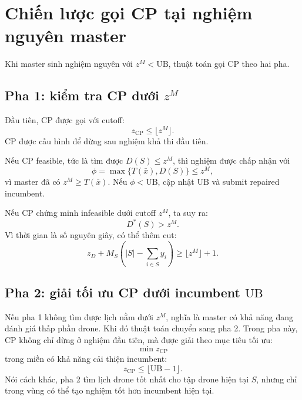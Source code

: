 \documentclass[12pt,a4paper]{article}
\newcommand{\UB}{\mathrm{UB}}
\begin{document}
\section{Chiến lược gọi CP tại nghiệm nguyên master}
\label{sec:cp-validation}

Khi master sinh nghiệm nguyên với $z^M<\UB$, thuật toán gọi CP theo hai pha.

\subsection{Pha 1: kiểm tra CP dưới $z^M$}

Đầu tiên, CP được gọi với cutoff:
\begin{equation}
    z_{\mathrm{CP}}\le \lfloor z^M\rfloor.
    \label{eq:cp-cutoff-zm}
\end{equation}
CP được cấu hình để dừng sau nghiệm khả thi đầu tiên.

Nếu CP feasible, tức là tìm được $D(S)\le z^M$, thì nghiệm được chấp nhận với
\[
    \phi=\max\{T(\bar x),D(S)\}\le z^M,
\]
vì master đã có $z^M\ge T(\bar x)$. Nếu $\phi<\UB$, cập nhật $\UB$ và submit repaired incumbent.

Nếu CP chứng minh infeasible dưới cutoff $z^M$, ta suy ra:
\[
    D^*(S)>z^M.
\]
Vì thời gian là số nguyên giây, có thể thêm cut:
\begin{equation}
    z_D+M_S\left(|S|-\sum_{i\in S}y_i\right)
    \ge \lfloor z^M\rfloor+1.
    \label{eq:cut-zm-plus-one}
\end{equation}

\subsection{Pha 2: giải tối ưu CP dưới incumbent $\UB$}
\label{subsec:phase2-optimal-cp}

Nếu pha 1 không tìm được lịch nằm dưới $z^M$, nghĩa là master có khả năng đang đánh giá thấp phần drone. Khi đó thuật toán chuyển sang pha 2. Trong pha này, CP không chỉ dừng ở nghiệm đầu tiên, mà được giải theo mục tiêu tối ưu:
\begin{equation}
    \min z_{\mathrm{CP}}
    \label{eq:cp-phase2-objective}
\end{equation}
trong miền có khả năng cải thiện incumbent:
\begin{equation}
    z_{\mathrm{CP}}\le \lfloor \UB-1\rfloor.
    \label{eq:cp-cutoff-ub-minus-one}
\end{equation}
Nói cách khác, pha 2 tìm lịch drone tốt nhất cho tập drone hiện tại $S$, nhưng chỉ trong vùng có thể tạo nghiệm tốt hơn incumbent hiện tại.
\end{document}
